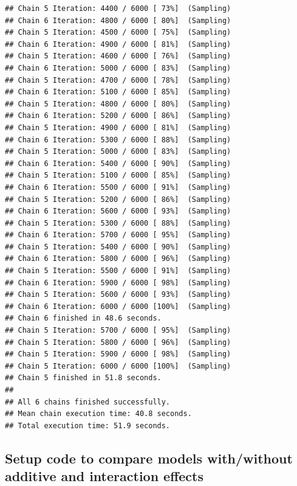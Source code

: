 \documentclass[
]{article}
\newenvironment{Shaded}{\begin{snugshade}}{\end{snugshade}}
\newcommand{\FunctionTok}[1]{\textcolor[rgb]{0.13,0.29,0.53}{\textbf{#1}}}
\newcommand{\NormalTok}[1]{#1}
\newcommand{\SpecialCharTok}[1]{\textcolor[rgb]{0.81,0.36,0.00}{\textbf{#1}}}
\newcommand{\StringTok}[1]{\textcolor[rgb]{0.31,0.60,0.02}{#1}}
\begin{document}
\begin{verbatim}
## Chain 5 Iteration: 4400 / 6000 [ 73%]  (Sampling) 
## Chain 6 Iteration: 4800 / 6000 [ 80%]  (Sampling) 
## Chain 5 Iteration: 4500 / 6000 [ 75%]  (Sampling) 
## Chain 6 Iteration: 4900 / 6000 [ 81%]  (Sampling) 
## Chain 5 Iteration: 4600 / 6000 [ 76%]  (Sampling) 
## Chain 6 Iteration: 5000 / 6000 [ 83%]  (Sampling) 
## Chain 5 Iteration: 4700 / 6000 [ 78%]  (Sampling) 
## Chain 6 Iteration: 5100 / 6000 [ 85%]  (Sampling) 
## Chain 5 Iteration: 4800 / 6000 [ 80%]  (Sampling) 
## Chain 6 Iteration: 5200 / 6000 [ 86%]  (Sampling) 
## Chain 5 Iteration: 4900 / 6000 [ 81%]  (Sampling) 
## Chain 6 Iteration: 5300 / 6000 [ 88%]  (Sampling) 
## Chain 5 Iteration: 5000 / 6000 [ 83%]  (Sampling) 
## Chain 6 Iteration: 5400 / 6000 [ 90%]  (Sampling) 
## Chain 5 Iteration: 5100 / 6000 [ 85%]  (Sampling) 
## Chain 6 Iteration: 5500 / 6000 [ 91%]  (Sampling) 
## Chain 5 Iteration: 5200 / 6000 [ 86%]  (Sampling) 
## Chain 6 Iteration: 5600 / 6000 [ 93%]  (Sampling) 
## Chain 5 Iteration: 5300 / 6000 [ 88%]  (Sampling) 
## Chain 6 Iteration: 5700 / 6000 [ 95%]  (Sampling) 
## Chain 5 Iteration: 5400 / 6000 [ 90%]  (Sampling) 
## Chain 6 Iteration: 5800 / 6000 [ 96%]  (Sampling) 
## Chain 5 Iteration: 5500 / 6000 [ 91%]  (Sampling) 
## Chain 6 Iteration: 5900 / 6000 [ 98%]  (Sampling) 
## Chain 5 Iteration: 5600 / 6000 [ 93%]  (Sampling) 
## Chain 6 Iteration: 6000 / 6000 [100%]  (Sampling) 
## Chain 6 finished in 48.6 seconds.
## Chain 5 Iteration: 5700 / 6000 [ 95%]  (Sampling) 
## Chain 5 Iteration: 5800 / 6000 [ 96%]  (Sampling) 
## Chain 5 Iteration: 5900 / 6000 [ 98%]  (Sampling) 
## Chain 5 Iteration: 6000 / 6000 [100%]  (Sampling) 
## Chain 5 finished in 51.8 seconds.
## 
## All 6 chains finished successfully.
## Mean chain execution time: 40.8 seconds.
## Total execution time: 51.9 seconds.
\end{verbatim}

\begin{Shaded}
\end{Shaded}

\subsection{Setup code to compare models with/without additive and
interaction
effects}\label{setup-code-to-compare-models-withwithout-additive-and-interaction-effects}
\end{document}
